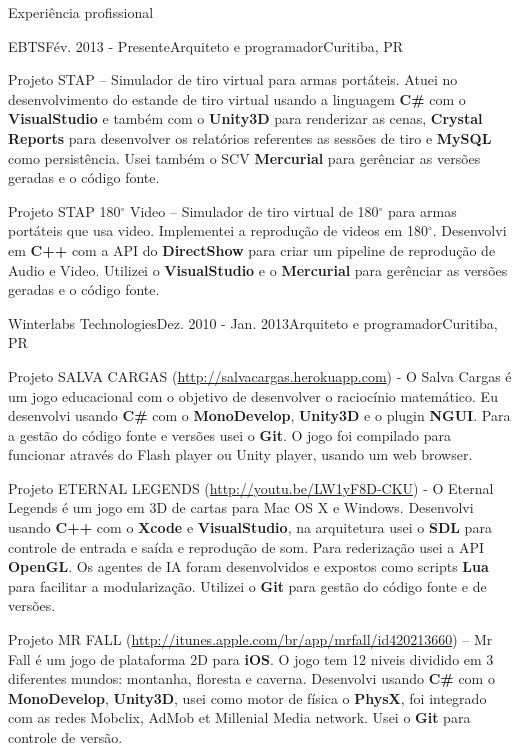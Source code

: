 \documentclass{resume}
\begin{document}
  \begin{rSection}{Experiência profissional}
    \begin{rSubsection}{EBTS}{Fév. 2013 - Presente}{Arquiteto e programador}{Curitiba, PR}
    \item Projeto STAP – Simulador de tiro virtual para armas portáteis. Atuei no desenvolvimento do estande de tiro virtual usando a linguagem \textbf{C\#} com o \textbf{VisualStudio} e também com o \textbf{Unity3D} para renderizar as cenas, \textbf{Crystal Reports} para desenvolver os relatórios referentes as sessões de tiro e \textbf{MySQL} como persistência. Usei também o SCV \textbf{Mercurial} para gerênciar as versões geradas e o código fonte. \\
    \item Projeto STAP 180$^\circ$ Video – Simulador de tiro virtual de 180$^\circ$ para armas portáteis que usa video. Implementei a reprodução de videos em 180$^\circ$. Desenvolvi em \textbf{C++} com a API do \textbf{DirectShow} para criar um pipeline de reprodução de Audio e Video. Utilizei o \textbf{VisualStudio} e o \textbf{Mercurial} para gerênciar as versões geradas e o código fonte.
    \end{rSubsection}
    \begin{rSubsection}{Winterlabs Technologies}{Dez. 2010 - Jan. 2013}{Arquiteto e programador}{Curitiba, PR}
    \item Projeto SALVA CARGAS (\url{http://salvacargas.herokuapp.com}) - O Salva Cargas é um jogo educacional com o objetivo de desenvolver o raciocínio matemático. Eu desenvolvi usando \textbf{C\#} com o \textbf{MonoDevelop}, \textbf{Unity3D} e o plugin \textbf{NGUI}. Para a gestão do código fonte e versões usei o \textbf{Git}. O jogo foi compilado para funcionar através do Flash player ou Unity player, usando um web browser. \\
    \item Projeto ETERNAL LEGENDS (\url{http://youtu.be/LW1yF8D-CKU}) - O Eternal Legends é um jogo em 3D de cartas para Mac OS X e Windows. Desenvolvi usando \textbf{C++} com o \textbf{Xcode} e \textbf{VisualStudio}, na arquitetura usei o \textbf{SDL} para controle de entrada e saída e reprodução de som. Para rederização usei a API \textbf{OpenGL}. Os agentes de IA foram desenvolvidos e expostos como scripts \textbf{Lua} para facilitar a modularização. Utilizei o \textbf{Git} para gestão do código fonte e de versões. \\
    \item Projeto MR FALL (\url{http://itunes.apple.com/br/app/mrfall/id420213660}) – Mr Fall é um jogo de plataforma 2D para \textbf{iOS}. O jogo tem 12 niveis dividido em 3 diferentes mundos: montanha, floresta e caverna. Desenvolvi usando \textbf{C\#} com o \textbf{MonoDevelop}, \textbf{Unity3D}, usei como motor de física o \textbf{PhysX}, foi integrado com as redes Mobclix, AdMob et Millenial Media network. Usei o \textbf{Git} para controle de versão. \\

\end{rSubsection}
\end{rSection}
\end{document}
